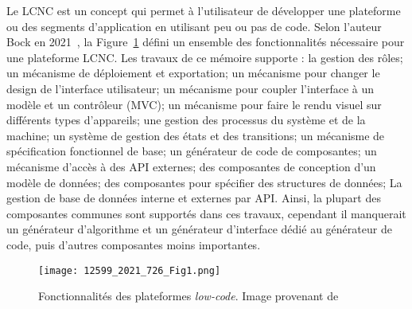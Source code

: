 Le LCNC est un concept qui permet à l’utilisateur de développer une plateforme ou des segments d'application en utilisant peu ou pas de code. Selon l'auteur Bock en 2021~\cite{LC_bock_2021}, la Figure~\ref{fig:lcnc_plateform} défini un ensemble des fonctionnalités nécessaire pour une plateforme LCNC. Les travaux de ce mémoire supporte : la gestion des rôles; un mécanisme de déploiement et exportation; un mécanisme pour changer le design de l'interface utilisateur; un mécanisme pour coupler l'interface à un modèle et un contrôleur (MVC); un mécanisme pour faire le rendu visuel sur différents types d'appareils; une gestion des processus du système et de la machine; un système de gestion des états et des transitions; un mécanisme de spécification fonctionnel de base; un générateur de code de composantes; un mécanisme d'accès à des API externes; des composantes de conception d'un modèle de données; des composantes pour spécifier des structures de données; La gestion de base de données interne et externes par API. Ainsi, la plupart des composantes communes sont supportés dans ces travaux, cependant il manquerait un générateur d'algorithme et un générateur d'interface dédié au générateur de code, puis d'autres composantes moins importantes.

\begin{figure}[htb]
\centering
\texttt{[image: 12599\_2021\_726\_Fig1.png]}
\caption{Fonctionnalités des plateformes \textit{low-code}. Image provenant de~\cite{LC_bock_2021}}
\label{fig:lcnc_plateform}
\end{figure}

